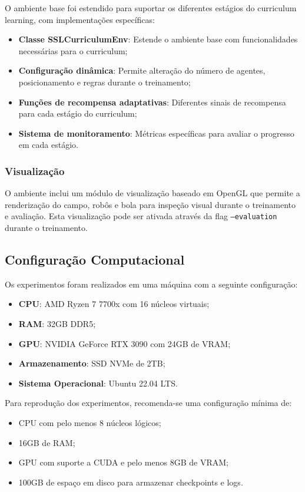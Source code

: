 O ambiente base foi estendido para suportar os diferentes estágios do curriculum learning, com implementações específicas:

\begin{itemize}
    \item \textbf{Classe SSLCurriculumEnv}: Estende o ambiente base com funcionalidades necessárias para o curriculum;
    \item \textbf{Configuração dinâmica}: Permite alteração do número de agentes, posicionamento e regras durante o treinamento;
    \item \textbf{Funções de recompensa adaptativas}: Diferentes sinais de recompensa para cada estágio do curriculum;
    \item \textbf{Sistema de monitoramento}: Métricas específicas para avaliar o progresso em cada estágio.
\end{itemize}

\subsubsection{Visualização}

O ambiente inclui um módulo de visualização baseado em OpenGL que permite a renderização do campo, robôs e bola para inspeção visual durante o treinamento e avaliação. Esta visualização pode ser ativada através da flag \texttt{--evaluation} durante o treinamento.

\subsection{Configuração Computacional}

Os experimentos foram realizados em uma máquina com a seguinte configuração:

\begin{itemize}
    \item \textbf{CPU}: AMD Ryzen 7 7700x com 16 núcleos virtuais;
    \item \textbf{RAM}: 32GB DDR5;
    \item \textbf{GPU}: NVIDIA GeForce RTX 3090 com 24GB de VRAM;
    \item \textbf{Armazenamento}: SSD NVMe de 2TB;
    \item \textbf{Sistema Operacional}: Ubuntu 22.04 LTS.
\end{itemize}

Para reprodução dos experimentos, recomenda-se uma configuração mínima de:

\begin{itemize}
    \item CPU com pelo menos 8 núcleos lógicos;
    \item 16GB de RAM;
    \item GPU com suporte a CUDA e pelo menos 8GB de VRAM;
    \item 100GB de espaço em disco para armazenar checkpoints e logs.
\end{itemize}

